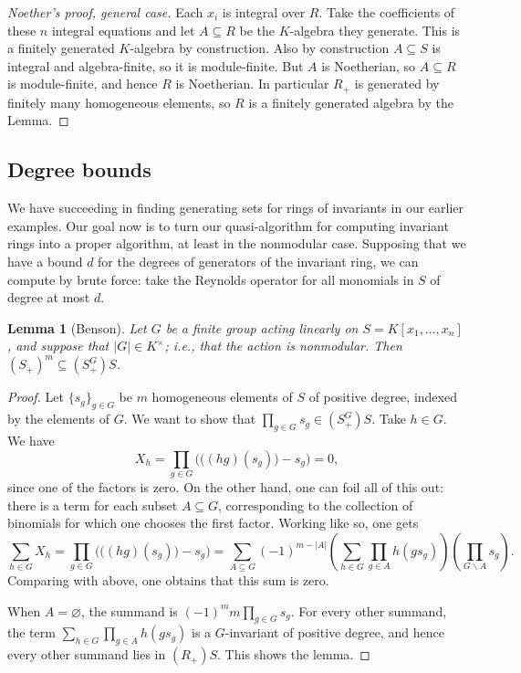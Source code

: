 \documentclass[12pt]{amsart}
\newtheorem{lemma}[theorem]{Lemma}
\theoremstyle{definition}
\numberwithin{equation}{theorem}
\begin{document}
\begin{proof}[Noether's proof, general case] Each $x_i$ is integral over $R$. Take the coefficients of these $n$ integral equations and let $A\subseteq R$ be the $K$-algebra they generate. This is a finitely generated $K$-algebra by construction. Also by construction $A\subseteq S$ is integral and algebra-finite, so it is module-finite. But $A$ is Noetherian, so $A\subseteq R$ is module-finite, and hence $R$ is Noetherian. In particular $R_+$ is generated by finitely many homogeneous elements, so $R$ is a finitely generated algebra by the Lemma.
\end{proof}

\subsection*{Degree bounds}


We have succeeding in finding generating sets for rings of invariants in our earlier examples. Our goal now is to turn our quasi-algorithm for computing invariant rings into a proper algorithm, at least in the nonmodular case. Supposing that we have a bound $d$ for the degrees of generators of the invariant ring, we can compute by brute force: take the Reynolds operator for all monomials in $S$ of degree at most $d$.

\begin{lemma}[Benson]
Let $G$ be a finite group acting linearly on $S=K[x_1,\dots,x_n]$, and suppose that $|G| \in K^\times$; i.e., that the action is nonmodular. Then ${(S_+)^m \subseteq (S^G_+) S}$.
\end{lemma} 
\begin{proof}
Let $\{s_g\}_{g\in G}$ be $m$ homogeneous elements of $S$ of positive degree, indexed by the elements of $G$. We want to show that $\prod_{g\in G} s_g \in (S^G_+)S$. Take $h\in G$. We have
\[ X_h = \prod_{g\in G} \Big( \big( (hg)(s_g)\big) - s_g \Big) = 0,\]
since one of the factors is zero.
On the other hand, one can foil all of this out: there is a term for each subset $A\subseteq G$, corresponding to the collection of binomials for which one chooses the first factor. Working like so, one gets
\[\sum_{h\in G} X_h = \prod_{g\in G} \Big( \big( (hg) (s_g) \big) - s_g \Big) = \sum_{A \subseteq G} (-1)^{m-|A|} \left( \sum_{h\in G} \prod_{g\in A} h(g s_g) \right) \left( \prod_{G\smallsetminus A} s_g\right).\]
Comparing with above, one obtains that this sum is zero.

When $A=\varnothing$, the summand is $(-1)^m m \prod_{g\in G} s_g$. For every other summand, the term $\sum_{h\in G} \prod_{g\in A} h(g s_g)$ is a $G$-invariant of positive degree, and hence every other summand lies in $(R_+)S$. This shows the lemma.
\end{proof}
\end{document}
